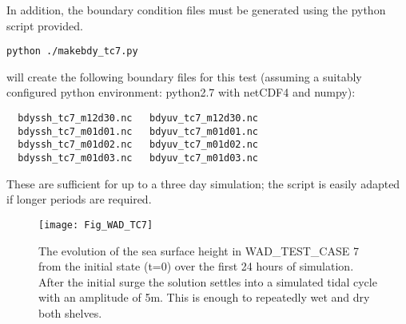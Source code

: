 In addition, the boundary condition files must be generated using the python script
provided.

\begin{verbatim}
python ./makebdy_tc7.py
\end{verbatim}

will create the following boundary files for this test (assuming a suitably configured
python environment: python2.7 with netCDF4 and numpy):

\begin{verbatim}
  bdyssh_tc7_m12d30.nc   bdyuv_tc7_m12d30.nc
  bdyssh_tc7_m01d01.nc   bdyuv_tc7_m01d01.nc
  bdyssh_tc7_m01d02.nc   bdyuv_tc7_m01d02.nc
  bdyssh_tc7_m01d03.nc   bdyuv_tc7_m01d03.nc
\end{verbatim}

These are sufficient for up to a three day simulation; the script is easily adapted if
longer periods are required.

\begin{sidewaysfigure}[htb] \begin{center}
\texttt{[image: Fig\_WAD\_TC7]}
\caption{ \label{Fig_WAD_TC7}
The evolution of the sea surface height in WAD\_TEST\_CASE 7 from the initial state (t=0)
over the first 24 hours of simulation. After the initial surge the solution settles into a
simulated tidal cycle with an amplitude of 5m. This is enough to repeatedly wet and dry
both shelves.}

\end{center}\end{sidewaysfigure}



%
%
%


